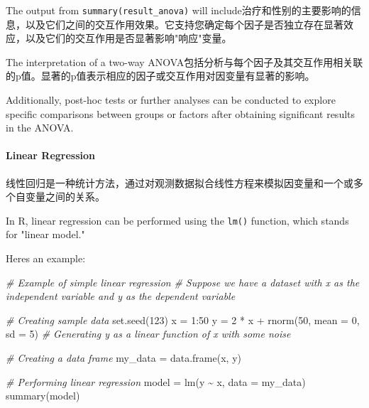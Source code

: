 \documentclass[
]{article}
\newenvironment{Shaded}{}{}
\newcommand{\AttributeTok}[1]{\textcolor[rgb]{0.49,0.56,0.16}{#1}}
\newcommand{\CommentTok}[1]{\textcolor[rgb]{0.38,0.63,0.69}{\textit{#1}}}
\newcommand{\DecValTok}[1]{\textcolor[rgb]{0.25,0.63,0.44}{#1}}
\newcommand{\FunctionTok}[1]{\textcolor[rgb]{0.02,0.16,0.49}{#1}}
\newcommand{\NormalTok}[1]{#1}
\newcommand{\OtherTok}[1]{\textcolor[rgb]{0.00,0.44,0.13}{#1}}
\newcommand{\SpecialCharTok}[1]{\textcolor[rgb]{0.25,0.44,0.63}{#1}}
\begin{document}
The output from \texttt{summary(result\_anova)} will
include治疗和性别的主要影响的信息，以及它们之间的交互作用效果。它支持您确定每个因子是否独立存在显著效应，以及它们的交互作用是否显著影响"响应"变量。

The interpretation of a two-way
ANOVA包括分析与每个因子及其交互作用相关联的p值。显著的p值表示相应的因子或交互作用对因变量有显著的影响。

Additionally, post-hoc tests or further analyses can be conducted to
explore specific comparisons between groups or factors after obtaining
significant results in the ANOVA.

\hypertarget{linear-regression}{%
\paragraph{Linear Regression}\label{linear-regression}}

线性回归是一种统计方法，通过对观测数据拟合线性方程来模拟因变量和一个或多个自变量之间的关系。

In R, linear regression can be performed using the \texttt{lm()}
function, which stands for "linear model."

Here\textquotesingle s an example:

\begin{Shaded}
\begin{Highlighting}[]
\CommentTok{\# Example of simple linear regression}
\CommentTok{\# Suppose we have a dataset with \textquotesingle{}x\textquotesingle{} as the independent variable and \textquotesingle{}y\textquotesingle{} as the dependent variable}

\CommentTok{\# Creating sample data}
\FunctionTok{set.seed}\NormalTok{(}\DecValTok{123}\NormalTok{)}
\NormalTok{x }\OtherTok{=} \DecValTok{1}\SpecialCharTok{:}\DecValTok{50}
\NormalTok{y }\OtherTok{=} \DecValTok{2} \SpecialCharTok{*}\NormalTok{ x }\SpecialCharTok{+} \FunctionTok{rnorm}\NormalTok{(}\DecValTok{50}\NormalTok{, }\AttributeTok{mean =} \DecValTok{0}\NormalTok{, }\AttributeTok{sd =} \DecValTok{5}\NormalTok{)  }\CommentTok{\# Generating \textquotesingle{}y\textquotesingle{} as a linear function of \textquotesingle{}x\textquotesingle{} with some noise}

\CommentTok{\# Creating a data frame}
\NormalTok{my\_data }\OtherTok{=} \FunctionTok{data.frame}\NormalTok{(x, y)}

\CommentTok{\# Performing linear regression}
\NormalTok{model }\OtherTok{=} \FunctionTok{lm}\NormalTok{(y }\SpecialCharTok{\textasciitilde{}}\NormalTok{ x, }\AttributeTok{data =}\NormalTok{ my\_data)}
\FunctionTok{summary}\NormalTok{(model)}
\end{Highlighting}
\end{Shaded}
\end{document}
